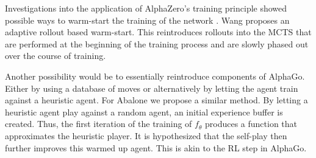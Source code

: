 Investigations into the application of AlphaZero's training principle showed possible ways to warm-start the training of the network \cite{wang_adaptive_2021}. Wang proposes an adaptive rollout based warm-start. This reintroduces rollouts into the MCTS that are performed at the beginning of the training process and are slowly phased out over the course of training.

Another possibility would be to essentially reintroduce components of AlphaGo. Either by using a database of moves or alternatively by letting the agent train against a heuristic agent. For Abalone we propose a similar method. By letting a heuristic agent play against a random agent, an initial experience buffer is created. Thus, the first iteration of the training of $f_{\theta}$ produces a function that approximates the heuristic player. It is hypothesized that the self-play then further improves this warmed up agent. This is akin to the RL step in AlphaGo.

